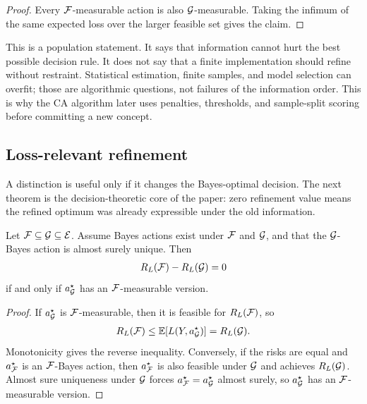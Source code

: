 \begin{proof}
Every $\mathcal{F}$-measurable action is also $\mathcal{G}$-measurable. Taking the infimum of the same expected loss over the larger feasible set gives the claim.
\end{proof}

This is a population statement. It says that information cannot hurt the best possible decision rule. It does not say that a finite implementation should refine without restraint. Statistical estimation, finite samples, and model selection can overfit; those are algorithmic questions, not failures of the information order. This is why the CA algorithm later uses penalties, thresholds, and sample-split scoring before committing a new concept.

\subsection{Loss-relevant refinement}

A distinction is useful only if it changes the Bayes-optimal decision. The next theorem is the decision-theoretic core of the paper: zero refinement value means the refined optimum was already expressible under the old information.

\begin{theorem}
\label{thm:loss-relevant-refinement:informal}
Let $\mathcal{F}\subseteq\mathcal{G}\subseteq\mathcal{E}$. Assume Bayes actions exist under $\mathcal{F}$ and $\mathcal{G}$, and that the $\mathcal{G}$-Bayes action is almost surely unique. Then
\begin{align*}
R_L(\mathcal{F})-R_L(\mathcal{G})=0
\end{align*}
if and only if $a_{\mathcal{G}}^\star$ has an $\mathcal{F}$-measurable version.
\end{theorem}

\begin{proof}
If $a_{\mathcal{G}}^\star$ is $\mathcal{F}$-measurable, then it is feasible for $R_L(\mathcal{F})$, so
\begin{align*}
R_L(\mathcal{F})\le \operatorname*{\mathbb{E}}[L(Y,a_{\mathcal{G}}^\star)]=R_L(\mathcal{G}).
\end{align*}
Monotonicity gives the reverse inequality. Conversely, if the risks are equal and $a_{\mathcal{F}}^\star$ is an $\mathcal{F}$-Bayes action, then $a_{\mathcal{F}}^\star$ is also feasible under $\mathcal{G}$ and achieves $R_L(\mathcal{G})$. Almost sure uniqueness under $\mathcal{G}$ forces $a_{\mathcal{F}}^\star=a_{\mathcal{G}}^\star$ almost surely, so $a_{\mathcal{G}}^\star$ has an $\mathcal{F}$-measurable version.
\end{proof}

